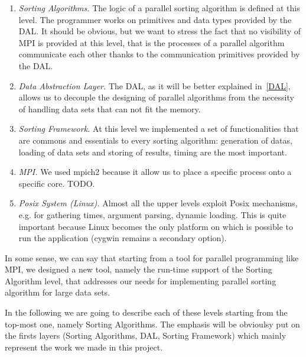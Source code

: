 \begin{enumerate}
\item \textit{Sorting Algorithms.} The logic of a parallel sorting algorithm is defined at this level. The programmer works on primitives and data types provided by the DAL. It should be obvious, but we want to stress the fact that no visibility of MPI is provided at this level, that is the processes of a parallel algorithm communicate each other thanks to the communication primitives provided by the DAL.  
\item \textit{Data Abstraction Layer.} The DAL, as it will be better explained in~\ref{DAL}, allows us to decouple the designing of parallel algorithms from the necessity of handling data sets that can not fit the memory. 
\item \textit{Sorting Framework.} At this level we implemented a set of functionalities that are commons and essentials to every sorting algorithm: generation of datas, loading of data sets and storing of results, timing are the most important. 
\item \textit{MPI.} We used mpich2 because it allow us to place a specific process onto a specific core. TODO.
\item \textit{Posix System (Linux).} Almost all the upper levels exploit Posix mechanisms, e.g. for gathering times, argument parsing, dynamic loading. This is quite important because Linux becomes the only platform on which is possible to run the application (cygwin remains a secondary option). 
\end{enumerate}
In some sense, we can say that starting from a tool for parallel programming like MPI, we designed a new tool, namely the run-time support of the Sorting Algorithm level, that addresses our needs for implementing parallel sorting algorithm for large data sets. 

In the following we are going to describe each of these levels starting from the top-most one, namely Sorting Algorithms. The emphasis will be obvioulsy put on the firsts layers (Sorting Algorithms, DAL, Sorting Framework) which mainly represent the work we made in this project.

